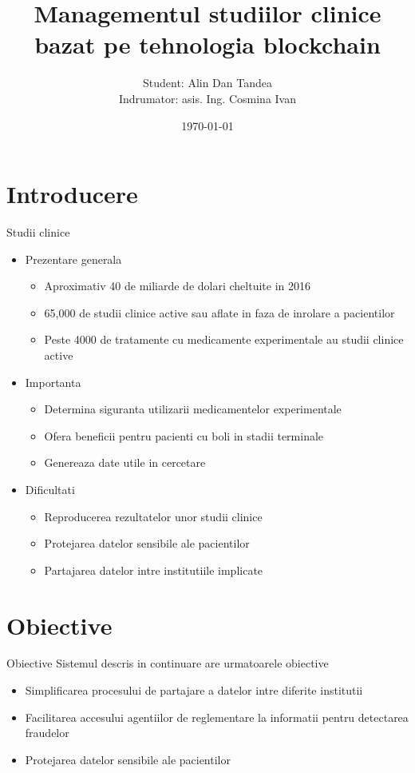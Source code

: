 \documentclass[10pt]{beamer}
\title{Managementul studiilor clinice bazat pe tehnologia blockchain}
\date{\today}
\author{Student:    Alin Dan Tandea \\
		Indrumator: asis. Ing. Cosmina Ivan}
\institute{Universitatea Tehnica din Cluj Napoca}
\begin{document}
  \maketitle
  \section{Introducere}
  \begin{frame}{Studii clinice}
  \begin{itemize}%
  	\item Prezentare generala
  		\begin{itemize}%
    		\item Aproximativ 40 de miliarde de dolari cheltuite in 2016  \cite{Knuth92}
    		\item 65,000 de studii clinice active sau aflate in faza de inrolare a pacientilor
    		\item Peste 4000 de tratamente cu medicamente experimentale au studii clinice active
  	\end{itemize}
  	\item Importanta   	
  		\begin{itemize}%
   			\item Determina siguranta utilizarii medicamentelor experimentale
  			\item Ofera beneficii pentru pacienti cu boli in stadii terminale
  			\item Genereaza date utile in cercetare 
  		\end{itemize}
  	\item Dificultati	
  		\begin{itemize}%
   			\item Reproducerea rezultatelor unor studii clinice
  			\item Protejarea datelor sensibile ale pacientilor
  			\item Partajarea datelor intre institutiile implicate
  		\end{itemize}
  \end{itemize}  
  \end{frame}
  \section{Obiective}
  \begin{frame}{Obiective}
  	Sistemul descris in continuare are urmatoarele obiective
  	\begin{itemize}%
  		\item Simplificarea procesului de partajare a datelor intre diferite institutii
  		\item Facilitarea accesului agentiilor de reglementare la informatii pentru detectarea fraudelor
  		\item Protejarea datelor sensibile ale pacientilor  
  	\end{itemize}
  \end{frame}
\end{document}
